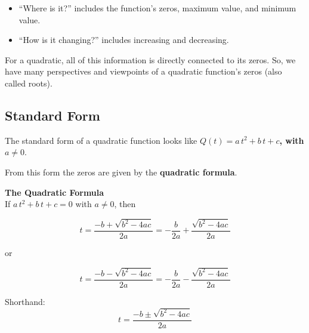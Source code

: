 \documentclass{ximera}
\begin{document}
\begin{itemize}
\item ``Where is it?'' includes the function's zeros, maximum value, and minimum value.
\item ``How is it changing?'' includes increasing and decreasing.
\end{itemize}



For a quadratic, all of this information is directly connected to its zeros.  So, we have many perspectives and viewpoints of a quadratic function's zeros (also called roots).


















\subsection*{Standard Form}






The standard form of a quadratic function looks like \textbf{$Q(t) = a \, t^2 + b \, t + c$, with $a \ne 0$}.  

From this form the zeros are given by the \textbf{quadratic formula}.





\begin{definition} \textbf{\textcolor{green!50!black}{The Quadratic Formula}} \\



If $a \, t^2 + b \, t + c = 0$ with $a \ne 0$, then


\[ t    = \frac{-b + \sqrt{b^2 - 4 a c}}{2a}  = - \frac{b}{2 a} + \frac{\sqrt{b^2 - 4 a c}}{2a}     \]

or

\[ t   =    \frac{-b - \sqrt{b^2 - 4 a c}}{2a}   = - \frac{b}{2 a}  -\frac{\sqrt{b^2 - 4 a c}}{2a}   \]



Shorthand: 
\[ t  =   \frac{-b \pm \sqrt{b^2 - 4 a c}}{2a}      \]


\end{definition}
\end{document}
